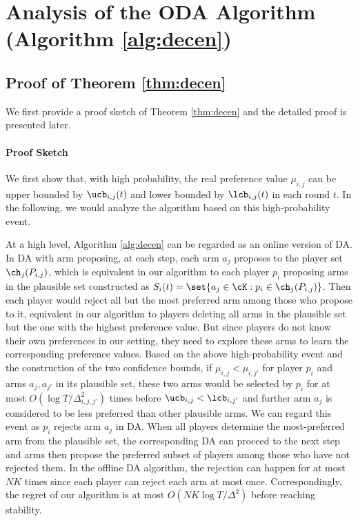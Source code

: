 


\section{Analysis of the ODA Algorithm (Algorithm \ref{alg:decen}) }\label{sec:oda:appendix}






\subsection{Proof of Theorem \ref{thm:decen} }\label{sec:proof:decen}

We first provide a proof sketch of Theorem \ref{thm:decen} and the detailed proof is presented later. 






\paragraph{Proof Sketch}\label{sec:proof:sketch}
We first show that, with high probability, the real preference value $\mu_{i,j}$ can be upper bounded by $\ucb_{i,j}(t)$ and lower bounded by $\lcb_{i,j}(t)$ in each round $t$. In the following, we would analyze the algorithm based on this high-probability event. 

At a high level, Algorithm \ref{alg:decen} can be regarded as an online version of DA. 
In DA with arm proposing, at each step, each arm $a_j$ proposes to the player set $\ch_j(P_{i,j})$, which is equivalent in our algorithm to each player $p_i$ proposing arms in the plausible set constructed as $S_i(t)=\set{a_j\in \cK: p_i \in \ch_j(P_{i,j})}$.
Then each player would reject all but the most preferred arm among those who propose to it, equivalent in our algorithm to players deleting all arms in the plausible set but the one with the highest preference value. 
But since players do not know their own preferences in our setting, they need to explore these arms to learn the corresponding preference values. 
Based on the above high-probability event and the construction of the two confidence bounds, if $\mu_{i,j}<\mu_{i,j'}$ for player $p_i$ and arms $a_j,a_{j'}$ in its plausible set, these two arms would be selected by $p_i$ for at most $O(\log T/\Delta^2_{i,j,j'})$ times before $\ucb_{i,j}<\lcb_{i,j'}$ and further arm $a_j$ is considered to be less preferred than other plausible arms. 
We can regard this event as $p_i$ rejects arm $a_j$ in DA. 
When all players determine the most-preferred arm from the plausible set, the corresponding DA can proceed to the next step and arms then propose the preferred subset of players among those who have not rejected them. 
In the offline DA algorithm, the rejection can happen for at most $NK$ times since each player can reject each arm at most once. 
Correspondingly, the regret of our algorithm is at most $O(NK\log T/\Delta^2)$ before reaching stability. 








